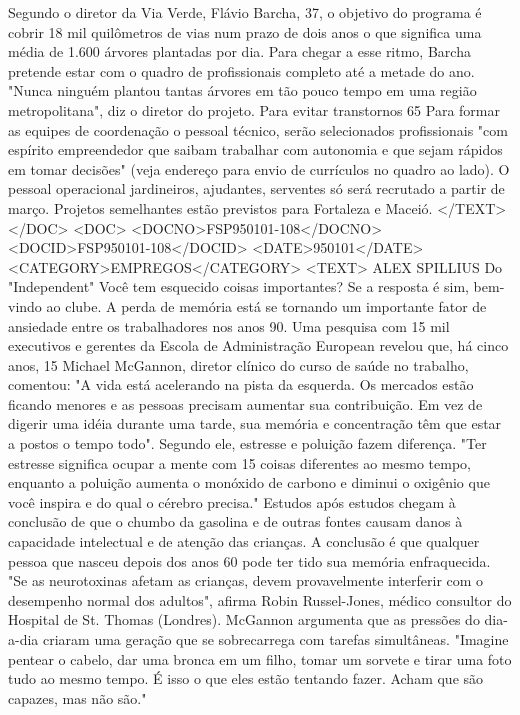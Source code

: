 Segundo o diretor da Via Verde, Flávio Barcha, 37, o objetivo do programa é cobrir 18 mil quilômetros de vias num prazo de dois anos o que significa uma média de 1.600 árvores plantadas por dia.
Para chegar a esse ritmo, Barcha pretende estar com o quadro de profissionais completo até a metade do ano. "Nunca ninguém plantou tantas árvores em tão pouco tempo em uma região metropolitana", diz o diretor do projeto.
Para evitar transtornos 65%
Para formar as equipes de coordenação o pessoal técnico, serão selecionados profissionais "com espírito empreendedor que saibam trabalhar com autonomia e que sejam rápidos em tomar decisões" (veja endereço para envio de currículos no quadro ao lado).
O pessoal operacional jardineiros, ajudantes, serventes só será recrutado a partir de março.
Projetos semelhantes estão previstos para Fortaleza e Maceió.
</TEXT>
</DOC>
<DOC>
<DOCNO>FSP950101-108</DOCNO>
<DOCID>FSP950101-108</DOCID>
<DATE>950101</DATE>
<CATEGORY>EMPREGOS</CATEGORY>
<TEXT>
ALEX SPILLIUS 
Do "Independent"
Você tem esquecido coisas importantes? Se a resposta é sim, bem-vindo ao clube. A perda de memória está se tornando um importante fator de ansiedade entre os trabalhadores nos anos 90.
Uma pesquisa com 15 mil executivos e gerentes da Escola de Administração European revelou que, há cinco anos, 15%
Michael McGannon, diretor clínico do curso de saúde no trabalho, comentou: "A vida está acelerando na pista da esquerda. Os mercados estão ficando menores e as pessoas precisam aumentar sua contribuição. Em vez de digerir uma idéia durante uma tarde, sua memória e concentração têm que estar a postos o tempo todo".
Segundo ele, estresse e poluição fazem diferença. "Ter estresse significa ocupar a mente com 15 coisas diferentes ao mesmo tempo, enquanto a poluição aumenta o monóxido de carbono e diminui o oxigênio que você inspira e do qual o cérebro precisa."
Estudos após estudos chegam à conclusão de que o chumbo da gasolina e de outras fontes causam danos à capacidade intelectual e de atenção das crianças. A conclusão é que qualquer pessoa que nasceu depois dos anos 60 pode ter tido sua memória enfraquecida.
"Se as neurotoxinas afetam as crianças, devem provavelmente interferir com o desempenho normal dos adultos", afirma Robin Russel-Jones, médico consultor do Hospital de St. Thomas (Londres).
McGannon argumenta que as pressões do dia-a-dia criaram uma geração que se sobrecarrega com tarefas simultâneas. "Imagine pentear o cabelo, dar uma bronca em um filho, tomar um sorvete e tirar uma foto tudo ao mesmo tempo. É isso o que eles estão tentando fazer. Acham que são capazes, mas não são."
